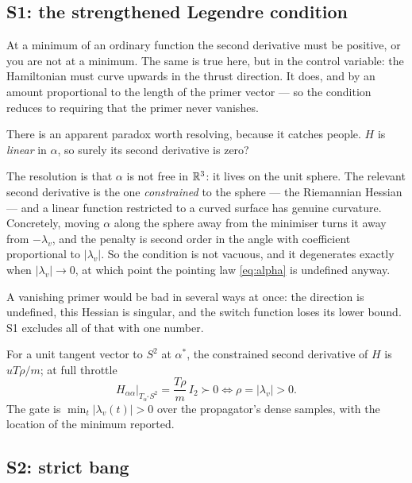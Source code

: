 \documentclass[11pt]{article}
\newcommand{\lv}{\lambda_v}\newcommand{\lr}{\lambda_r}\newcommand{\lm}{\lambda_m}
\begin{document}
\subsection{S1: the strengthened Legendre condition}\label{sec:S1}

\begin{eli}
At a minimum of an ordinary function the second derivative must be positive, or
you are not at a minimum. The same is true here, but in the control variable:
the Hamiltonian must curve upwards in the thrust direction. It does, and by an
amount proportional to the length of the primer vector --- so the condition
reduces to requiring that the primer never vanishes.
\end{eli}

\begin{intu}
There is an apparent paradox worth resolving, because it catches people. $H$ is
\emph{linear} in $\alpha$, so surely its second derivative is zero?

The resolution is that $\alpha$ is not free in $\mathbb{R}^3$: it lives on the unit
sphere. The relevant second derivative is the one \emph{constrained} to the
sphere --- the Riemannian Hessian --- and a linear function restricted to a
curved surface has genuine curvature. Concretely, moving $\alpha$ along the
sphere away from the minimiser turns it away from $-\lv$, and the penalty is
second order in the angle with coefficient proportional to $|\lv|$. So the
condition is not vacuous, and it degenerates exactly when $|\lv| \to 0$, at
which point the pointing law \eqref{eq:alpha} is undefined anyway.

A vanishing primer would be bad in several ways at once: the direction is
undefined, this Hessian is singular, and the switch function loses its lower
bound. S1 excludes all of that with one number.
\end{intu}

\begin{rig}
For a unit tangent vector to $S^2$ at $\alpha^*$, the constrained second
derivative of $H$ is $uT\rho/m$; at full throttle
\begin{equation}\label{eq:legendre}
H_{\alpha\alpha}\big|_{T_{\alpha^*}S^2} = \frac{T\rho}{m}\, I_2 \succ 0
\iff \rho = |\lv| > 0 .
\end{equation}
The gate is $\min_t |\lv(t)| > 0$ over the propagator's dense samples, with the
location of the minimum reported.
\end{rig}

\subsection{S2: strict bang}\label{sec:S2}
\end{document}
